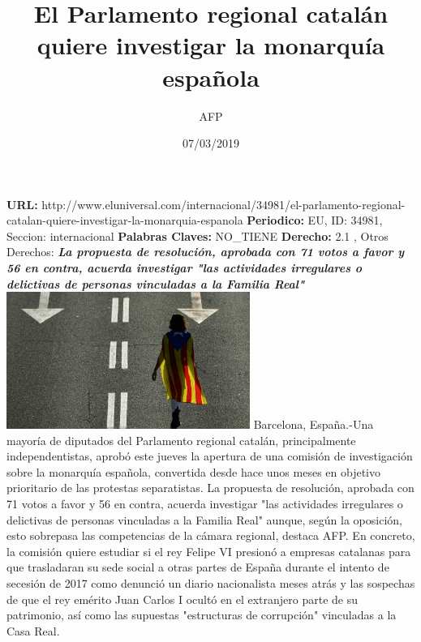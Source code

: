 \documentclass{article}%
\title{\textbf{El Parlamento regional catalán quiere investigar la monarquía española}}%
\author{AFP}%
\date{07/03/2019}%
\begin{document}
%
\normalsize%
\maketitle%
\textbf{URL: }%
http://www.eluniversal.com/internacional/34981/el{-}parlamento{-}regional{-}catalan{-}quiere{-}investigar{-}la{-}monarquia{-}espanola\newline%
%
\textbf{Periodico: }%
EU, %
ID: %
34981, %
Seccion: %
internacional\newline%
%
\textbf{Palabras Claves: }%
NO\_TIENE\newline%
%
\textbf{Derecho: }%
2.1%
, Otros Derechos: %
\newline%
%
\textbf{\textit{La propuesta de resolución, aprobada con 71 votos a favor y 56 en contra, acuerda investigar "las actividades irregulares o delictivas de personas vinculadas a la Familia Real"}}%
\newline%
\newline%
%
\includegraphics[width=300px]{EU_34981.jpg}%
\newline%
%
Barcelona, España.{-}Una mayoría de diputados del Parlamento regional catalán, principalmente independentistas, aprobó este jueves la apertura de una comisión de investigación sobre la monarquía española, convertida desde hace unos meses en objetivo prioritario de las protestas separatistas.%
\newline%
%
La propuesta de resolución, aprobada con 71 votos a favor y 56 en contra, acuerda investigar "las actividades irregulares o delictivas de personas vinculadas a la Familia Real" aunque, según la oposición, esto sobrepasa las competencias de la cámara regional, destaca AFP.%
\newline%
%
En concreto, la comisión quiere estudiar si el rey Felipe VI presionó a empresas catalanas para que trasladaran su sede social a otras partes de España durante el intento de secesión de 2017 como denunció un diario nacionalista meses atrás y las sospechas de que el rey emérito Juan Carlos I ocultó en el extranjero parte de su patrimonio, así como las supuestas "estructuras de corrupción" vinculadas a la Casa Real.%
\end{document}
